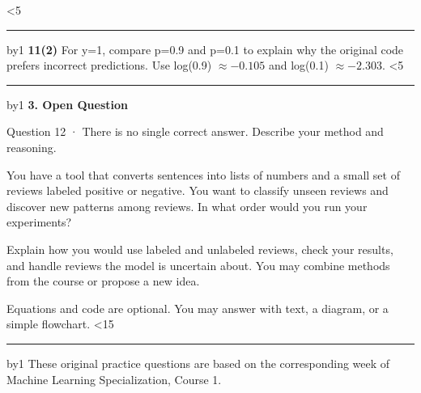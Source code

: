 \documentclass[11pt,a4paper]{article}
\newcommand{\parttitle}[2]{{\large\bfseries\color{ink} #1}\par{\small #2}\par\vspace{5mm}}
\newcommand{\answerlines}[1]{\foreachline{#1}}
\newcommand{\foreachline}[1]{\linecount=0\loop\ifnum\linecount<#1\vspace{8mm}\par{\color{rulegray}\hrule}\advance\linecount by1\repeat}
\begin{document}
\answerlines{5}
\vspace{6mm}
\textbf{11(2)} For y=1, compare p=0.9 and p=0.1 to explain why the original code prefers incorrect predictions. Use log(0.9) $\approx-0.105$ and log(0.1) $\approx-2.303$.
\answerlines{5}
\vspace{6mm}
\newpage
\parttitle{3. Open Question}{Question 12 · There is no single correct answer. Describe your method and reasoning.}
You have a tool that converts sentences into lists of numbers and a small set of reviews labeled positive or negative. You want to classify unseen reviews and discover new patterns among reviews. In what order would you run your experiments?
\par\vspace{3mm}
Explain how you would use labeled and unlabeled reviews, check your results, and handle reviews the model is uncertain about. You may combine methods from the course or propose a new idea.
\par\vspace{3mm}
{\small Equations and code are optional. You may answer with text, a diagram, or a simple flowchart.}
\answerlines{15}
\vfill{\footnotesize These original practice questions are based on the corresponding week of Machine Learning Specialization, Course 1.}
\end{document}
